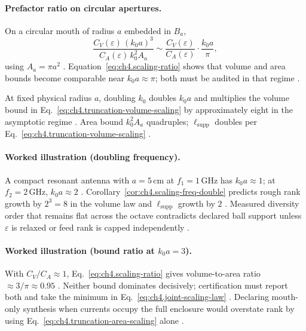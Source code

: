 \paragraph{Prefactor ratio on circular apertures.}
On a circular mouth of radius \(a\) embedded in \(B_{a}\),
\begin{equation}
\label{eq:ch4.scaling-ratio}
\frac{C_{V}(\varepsilon)\,(k_{0}a)^{3}}{C_{A}(\varepsilon)\,k_{0}^{2}A_{a}}
\sim
\frac{C_{V}(\varepsilon)}{C_{A}(\varepsilon)}\cdot\frac{k_{0}a}{\pi},
\end{equation}
using \(A_{a}=\pi a^{2}\) \cite{collin2001,jackson1999,hansen1988}. Equation~\eqref{eq:ch4.scaling-ratio} shows that volume and area
bounds become comparable near \(k_{0}a\approx\pi\); both must be audited in that regime \cite{harrington2001,devaney2004,stratton1941}.

\begin{corollary}
\label{cor:ch4.scaling-freq-double}
At fixed physical radius \(a\), doubling \(k_{0}\) doubles \(k_{0}a\) and multiplies the volume bound in
Eq.~\eqref{eq:ch4.truncation-volume-scaling} by approximately eight in the asymptotic regime \cite{jackson1999,hansen1988,harrington2001}.
Area bound \(k_{0}^{2}A_{a}\) quadruples; \(\ell_{\mathrm{supp}}\) doubles per Eq.~\eqref{eq:ch4.truncation-volume-scaling}
\cite{devaney2004,stratton1941}.
\end{corollary}

\paragraph{Worked illustration (doubling frequency).}
A compact resonant antenna with \(a=5\,\mathrm{cm}\) at \(f_{1}=1\,\mathrm{GHz}\) has \(k_{0}a\approx1\); at \(f_{2}=2\,\mathrm{GHz}\),
\(k_{0}a\approx2\) \cite{jackson1999,collin2001}. Corollary~\ref{cor:ch4.scaling-freq-double} predicts rough rank growth by
\(2^{3}=8\) in the volume law and \(\ell_{\mathrm{supp}}\) growth by \(2\) \cite{hansen1988,harrington2001}. Measured diversity order
that remains flat across the octave contradicts declared ball support unless \(\varepsilon\) is relaxed or feed rank is capped independently
\cite{devaney2004,stratton1941}.

\paragraph{Worked illustration (bound ratio at \(k_{0}a=3\)).}
With \(C_{V}/C_{A}\approx1\), Eq.~\eqref{eq:ch4.scaling-ratio} gives volume-to-area ratio \(\approx3/\pi\approx0.95\)
\cite{hansen1988,devaney2004,collin2001}. Neither bound dominates decisively; certification must report both and take the minimum in
Eq.~\eqref{eq:ch4.joint-scaling-law} \cite{harrington2001,stratton1941}. Declaring mouth-only synthesis when currents occupy the full
enclosure would overstate rank by using Eq.~\eqref{eq:ch4.truncation-area-scaling} alone \cite{jackson1999,hansen1988}.

